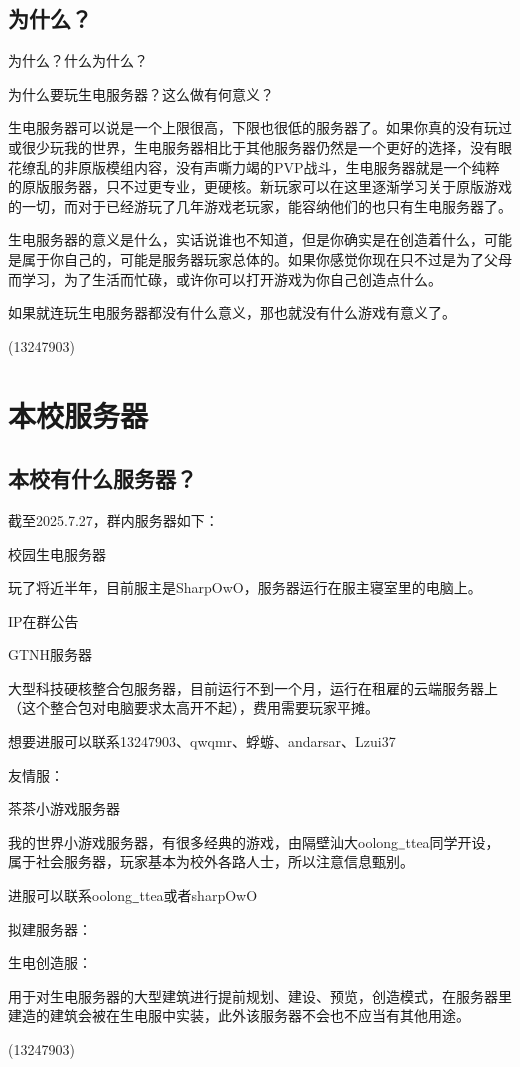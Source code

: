 \documentclass[UTF8,a4paper]{article}
\begin{document}
		\subsection{为什么？}
			\par 为什么？什么为什么？
			\par 为什么要玩生电服务器？这么做有何意义？
			\par 生电服务器可以说是一个上限很高，下限也很低的服务器了。如果你真的没有玩过或很少玩我的世界，生电服务器相比于其他服务器仍然是一个更好的选择，没有眼花缭乱的非原版模组内容，没有声嘶力竭的PVP战斗，生电服务器就是一个纯粹的原版服务器，只不过更专业，更硬核。新玩家可以在这里逐渐学习关于原版游戏的一切，而对于已经游玩了几年游戏老玩家，能容纳他们的也只有生电服务器了。
			\par 生电服务器的意义是什么，实话说谁也不知道，但是你确实是在创造着什么，可能是属于你自己的，可能是服务器玩家总体的。如果你感觉你现在只不过是为了父母而学习，为了生活而忙碌，或许你可以打开游戏为你自己创造点什么。
			\par 如果就连玩生电服务器都没有什么意义，那也就没有什么游戏有意义了。
			\begin{flushright}(13247903)\end{flushright}
	\section{本校服务器}
		\subsection{本校有什么服务器？}
			\par 截至2025.7.27，群内服务器如下：
			\par
			\par 校园生电服务器
			\par 玩了将近半年，目前服主是SharpOwO，服务器运行在服主寝室里的电脑上。
			\par IP在群公告
			\par 
			\par GTNH服务器
			\par 大型科技硬核整合包服务器，目前运行不到一个月，运行在租雇的云端服务器上（这个整合包对电脑要求太高开不起），费用需要玩家平摊。
			\par 想要进服可以联系13247903、qwqmr、蜉蝣、andarsar、Lzui37
			\par 
			\par 友情服：
			\par 茶茶小游戏服务器
			\par 我的世界小游戏服务器，有很多经典的游戏，由隔壁汕大oolong$\underline{\makebox[1ex]{}}$ttea同学开设，属于社会服务器，玩家基本为校外各路人士，所以注意信息甄别。
			\par 进服可以联系oolong$\underline{\makebox[1ex]{}}$ttea或者sharpOwO
			\par
			\par 拟建服务器：
			\par 生电创造服：
			\par 用于对生电服务器的大型建筑进行提前规划、建设、预览，创造模式，在服务器里建造的建筑会被在生电服中实装，此外该服务器不会也不应当有其他用途。
			\begin{flushright}(13247903)\end{flushright}
\end{document}
